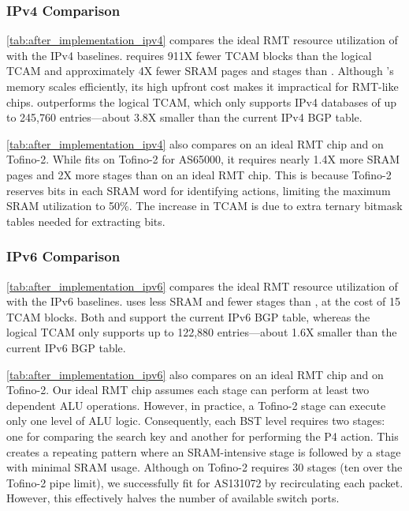 \subsubsection{IPv4 Comparison} \label{subsubsec:ipv4_comparison}

\cref{tab:after_implementation_ipv4} compares the ideal RMT resource utilization of \resail with the IPv4 baselines. \resail requires 911X fewer TCAM blocks than the logical TCAM and approximately 4X fewer SRAM pages and stages than \sail. Although \sail's memory scales efficiently, its high upfront cost makes it impractical for RMT-like chips. \resail outperforms the logical TCAM, which only supports IPv4 databases of up to 245,760 entries---about 3.8X smaller than the current IPv4 BGP table.

\cref{tab:after_implementation_ipv4} also compares \resail on an ideal RMT chip and on Tofino-2. While \resail fits on Tofino-2 for AS65000, it requires nearly 1.4X more SRAM pages and 2X more stages than on an ideal RMT chip. This is because Tofino-2 reserves bits in each SRAM word for identifying actions, limiting the maximum SRAM utilization to 50\%. The increase in TCAM is due to extra ternary bitmask tables needed for extracting bits.

\subsubsection{IPv6 Comparison} \label{subsubsec:ipv6_comparison}

\cref{tab:after_implementation_ipv6} compares the ideal RMT resource utilization of \bsic with the IPv6 baselines. \bsic uses less SRAM and fewer stages than \hibst, at the cost of 15 TCAM blocks. Both \bsic and \hibst support the current IPv6 BGP table, whereas the logical TCAM only supports up to 122,880 entries---about 1.6X smaller than the current IPv6 BGP table.

\cref{tab:after_implementation_ipv6} also compares \bsic on an ideal RMT chip and on Tofino-2. Our ideal RMT chip assumes each stage can perform at least two dependent ALU operations. However, in practice, a Tofino-2 stage can execute only one level of ALU logic. Consequently, each BST level requires two stages: one for comparing the search key and another for performing the P4 action. This creates a repeating pattern where an SRAM-intensive stage is followed by a stage with minimal SRAM usage. Although \bsic on Tofino-2 requires 30 stages (ten over the Tofino-2 pipe limit), we successfully fit \bsic for AS131072 by recirculating each packet. However, this effectively halves the number of available switch ports.